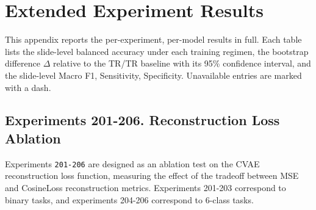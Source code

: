 %
%

\appendix

\chapter{Extended Experiment Results}
\label{app:extended_results}
\setcounter{table}{0}
\renewcommand{\thetable}{\Alph{chapter}.\arabic{table}}

This appendix reports the per-experiment, per-model results in full. Each table lists the slide-level balanced accuracy under each training regimen, the bootstrap difference $\Delta$ relative to the TR/TR baseline with its 95\% confidence interval, and the slide-level Macro F1, Sensitivity, Specificity. Unavailable entries are marked with a dash.

\section*{Experiments 201-206. Reconstruction Loss Ablation}
Experiments \texttt{201-206} are designed as an ablation test on the CVAE reconstruction loss function, measuring the effect of the tradeoff between MSE and CosineLoss reconstruction metrics. Experiments 201-203 correspond to binary tasks, and experiments 204-206 correspond to 6-class tasks.

